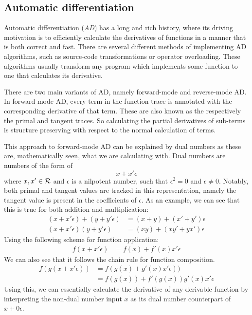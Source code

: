 \subsection{Automatic differentiation}

Automatic differentiation (\textit{AD}) has a long and rich history, where its driving motivation is to efficiently calculate the derivatives of functions in a manner that is both correct and fast\cite{Baydin2015AutomaticDI}.
There are several different methods of implementing AD algorithms, such as source-code transformations or operator overloading.
These algorithms usually transform any program which implements some function to one that calculates its derivative.

There are two main variants of AD, namely forward-mode and reverse-mode AD.
In forward-mode AD, every term in the function trace is annotated with the corresponding derivative of that term.
These are also known as the respectively the primal and tangent traces.
So calculating the partial derivatives of sub-terms is structure preserving with respect to the normal calculation of terms.

This approach to forward-mode AD can be explained by dual numbers as these are, mathematically seen, what we are calculating with\cite{Baydin2015AutomaticDI}. Dual numbers are numbers of the form of
$$
  x + x' \epsilon
$$
where $x, x' \in \mathcal{R}$ and $\epsilon$ is a nilpotent number, such that $\epsilon^2 = 0$ and $\epsilon \neq 0$.
Notably, both primal and tangent values are tracked in this representation, namely the tangent value is present in the coefficients of $\epsilon$.
As an example, we can see that this is true for both addition and multiplication:
\begin{align*}
  (x + x' \epsilon) + (y + y' \epsilon) &= (x + y) + (x' + y')\epsilon \\
  (x + x' \epsilon)(y + y' \epsilon) &= (xy) + (xy' + yx')\epsilon
\end{align*}
Using the following scheme for function application:
\begin{align*}
  f(x + x' \epsilon) &= f(x) + f'(x)x'\epsilon
\end{align*}
We can also see that it follows the chain rule for function composition.
\begin{align*}
  f(g(x + x' \epsilon)) &= f(g(x) + g'(x)x'\epsilon)) \\
    &= f(g(x)) + f'(g(x))g'(x)x'\epsilon
\end{align*}
Using this, we can essentially calculate the derivative of any derivable function by interpreting the non-dual number input $x$ as its dual number counterpart of $x + 0\epsilon$.

